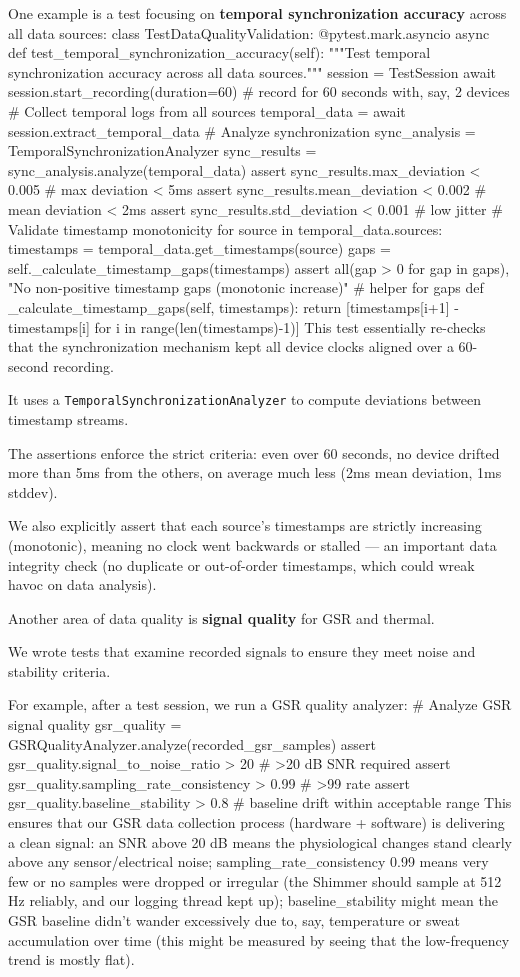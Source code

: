 {{One example is a test focusing on \textbf{temporal synchronization accuracy}
across all data sources: class TestDataQualityValidation: @pytest.mark.asyncio
async def test\_temporal\_synchronization\_accuracy(self): """Test temporal
synchronization accuracy across all data sources.""" session = TestSession await
session.start\_recording(duration=60) # record for 60 seconds with, say, 2
devices # Collect temporal logs from all sources temporal\_data = await
session.extract\_temporal\_data # Analyze synchronization sync\_analysis =
TemporalSynchronizationAnalyzer sync\_results =
sync\_analysis.analyze(temporal\_data) assert sync\_results.max\_deviation <
0.005 # max deviation < 5ms assert sync\_results.mean\_deviation < 0.002 # mean
deviation < 2ms assert sync\_results.std\_deviation < 0.001 # low jitter #
Validate timestamp monotonicity for source in temporal\_data.sources: timestamps
= temporal\_data.get\_timestamps(source) gaps =
self.\_calculate\_timestamp\_gaps(timestamps) assert all(gap > 0 for gap in
gaps), "No non-positive timestamp gaps (monotonic increase)" # helper for gaps
def \_calculate\_timestamp\_gaps(self, timestamps): return [timestamps[i+1] -
timestamps[i] for i in range(len(timestamps)-1)] This test essentially re-checks
that the synchronization mechanism kept all device clocks aligned over a
60-second recording.

It uses a \texttt{TemporalSynchronizationAnalyzer} to compute deviations between
timestamp streams.

The assertions enforce the strict criteria: even over 60 seconds, no device
drifted more than 5ms from the others, on average much less (2ms mean deviation,
1ms stddev).

We also explicitly assert that each source's timestamps are strictly increasing
(monotonic), meaning no clock went backwards or stalled --- an important data
integrity check (no duplicate or out-of-order timestamps, which could wreak
havoc on data analysis).

Another area of data quality is \textbf{signal quality}
 for GSR and thermal.

We wrote tests that examine recorded signals to ensure they meet noise and
stability criteria.

For example, after a test session, we run a GSR quality analyzer: # Analyze GSR
signal quality gsr\_quality = GSRQualityAnalyzer.analyze(recorded\_gsr\_samples)
assert gsr\_quality.signal\_to\_noise\_ratio > 20 # >20 dB SNR required assert
gsr\_quality.sampling\_rate\_consistency > 0.99 # >99%
rate assert gsr\_quality.baseline\_stability > 0.8 # baseline drift within
acceptable range This ensures that our GSR data collection process (hardware +
software) is delivering a clean signal: an SNR above 20 dB means the
physiological changes stand clearly above any sensor/electrical noise;
sampling\_rate\_consistency 0.99 means very few or no samples were dropped or
irregular (the Shimmer should sample at 512 Hz reliably, and our logging thread
kept up); baseline\_stability  might mean the GSR baseline didn't wander
excessively due to, say, temperature or sweat accumulation over time (this might
be measured by seeing that the low-frequency trend is mostly flat).

}}
